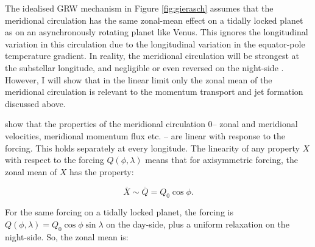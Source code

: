 The idealised GRW mechanism in Figure \ref{fig:gierasch} assumes that the meridional circulation has the same zonal-mean effect on a tidally locked planet as on an asynchronously rotating planet like Venus. This ignores the longitudinal variation in this circulation due to the longitudinal variation in the equator-pole temperature gradient. In reality, the meridional circulation will be strongest at the substellar longitude, and negligible or even reversed on the night-side \citep{charnay20153d}. However, I will show that in the linear limit only the zonal mean of the meridional circulation is relevant to the momentum transport and jet formation discussed above.


%
%
%
%

\citet{held1980nonlinear} show that the properties of the meridional circulation 0-- zonal and meridional velocities, meridional momentum flux etc. -- are linear with response to the forcing. This holds separately at every longitude. The linearity of any property $X$ with respect to the forcing $Q(\phi,\lambda)$ means that for axisymmetric forcing, the zonal mean of $X$ has the property:

\begin{equation}
  \overline{X} \sim \overline{Q} =Q_{0}\cos{\phi}.
\end{equation}

For the same forcing on a tidally locked planet, the forcing is $ Q(\phi,\lambda)=Q_{0}\cos{\phi}\sin{\lambda}$ on the day-side, plus a uniform relaxation on the night-side. So, the zonal mean is:

